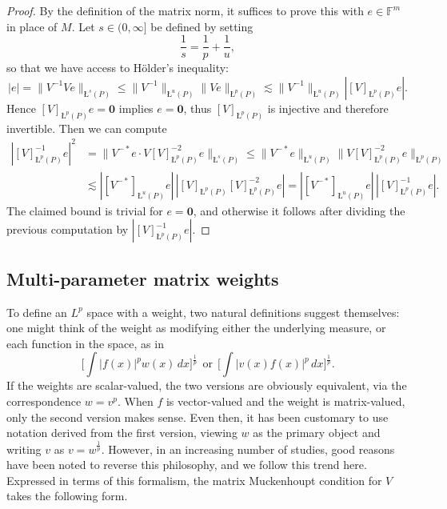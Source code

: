 \documentclass[11pt, reqno]{amsart}
\theoremstyle{definition}
\theoremstyle{remark}
\numberwithin{equation}{section}
\newcommand{\F}{\mathbb F}
\newcommand{\aveL}{\textit{\L}}
\newcommand{\abs}[1]{|#1|}
\newcommand{\Norm}[2]{\|#1\|_{#2}}
\begin{document}
\begin{proof}
By the definition of the matrix norm, it suffices to prove this with $e\in\F^m$ in place of $M$.
Let $s\in(0,\infty]$ be defined by setting
\begin{equation*}
\frac{1}{s}=\frac{1}{p}+\frac{1}{u},
\end{equation*}
so that we have access to H\"older's inequality:
\begin{equation*}
\abs{e}
=\Norm{V^{-1}Ve}{\aveL^{s}(P)}
\leq\Norm{V^{-1}}{\aveL^{u}(P)}\Norm{Ve}{\aveL^{p}(P)}
\lesssim\Norm{V^{-1}}{\aveL^{u}(P)}\abs{[V]_{\aveL^{p}(P)}e}.
\end{equation*}
Hence $[V]_{\aveL^{p}(P)}e =\mathbf 0$ implies $e=\mathbf 0$,
thus $[V]_{\aveL^{p}(P)}$ is injective and therefore invertible.
Then we can compute
\begin{align*}
|[V]_{\aveL^{p}(P)}^{-1}e|^2
&=\| V^{-*}e \cdot V[V]_{\aveL^{p}(P)}^{-2}e \|_{\aveL^{s}(P)}
\leq\Norm{V^{-*}e}{\aveL^{u}(P)}\Norm{V[V]_{\aveL^{p}(P)}^{-2}e}{\aveL^{p}(P)} \\
&\lesssim |[V^{-*}]_{\aveL^{u}(P)}e|\,
|[V]_{\aveL^{p}(P)}[V]_{\aveL^{p}(P)}^{-2}e|
=|[V^{-*}]_{\aveL^{u}(P)}e|\,
|[V]_{\aveL^{p}(P)}^{-1}e|.
\end{align*}
The claimed bound is trivial for $e=\mathbf 0$, and otherwise it follows after dividing the previous computation by $\abs{[V]_{\aveL^{p}(P)}^{-1}e}$.
\end{proof}

\subsection{Multi-parameter matrix weights} \label{multi Ap}

To define an $L^p$ space with a weight, two natural definitions suggest themselves: one might think of the weight as modifying either the underlying measure, or each function in the space, as in
\begin{equation*}
\bigg[\int |f(x)|^p w(x)\,dx\bigg]^{\frac1p}
\ \ \text{or}\ \
\bigg[\int |v(x)f(x)|^p\,dx\bigg]^{\frac1p}.
\end{equation*}
If the weights are scalar-valued, the two versions are obviously equivalent, via the correspondence $w=v^p$. When $f$ is vector-valued and the weight is matrix-valued, only the second version makes sense. Even then, it has been customary to use notation derived from the first version, viewing $w$ as the primary object and writing $v$ as $v=w^{\frac1p}$.
However, in an increasing number of studies, good reasons have been noted to reverse this philosophy, and we follow this trend here.
Expressed in terms of this formalism, the matrix Muckenhoupt condition for $V$ takes the following form.
\end{document}
